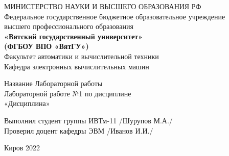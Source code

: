 \thispagestyle{empty}
\begin{center}
    МИНИСТЕРСТВО НАУКИ И ВЫСШЕГО ОБРАЗОВАНИЯ РФ\\
    Федеральное государственное бюджетное образовательное учреждение\\
    высшего профессионального образования\\
    {\bf«Вятский государственный университет»}\\
    {\bf(ФГБОУ ВПО «ВятГУ»)}\\
    Факультет автоматики и вычислительной техники\\
    Кафедра электронных вычислительных машин
\end{center}
\vfill %
\begin{center}
	Название Лабораторной работы \\
    Лабораторной работе №1 по дисциплине \\
    «Дисциплина»
\end{center}

\vfill
\begin{flushleft}
    Выполнил студент группы ИВТм-11 \hrulefill /Шурупов М.А./\\
    Проверил доцент кафедры ЭВМ \hrulefill  /Иванов И.И./
\end{flushleft}
\vfill %

\begin{center}
    Киров 2022
\end{center}
\newpage
